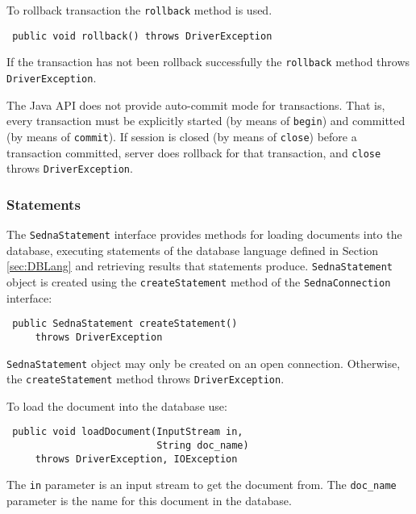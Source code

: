 \documentclass[a4paper,12pt]{article}
\begin{document}
To rollback transaction the \verb!rollback! method is used.

\begin{verbatim}
 public void rollback() throws DriverException
\end{verbatim}

If the transaction has not been rollback successfully the \verb!rollback! method
throws \verb!DriverException!.

The Java API does not provide auto-commit mode for transactions. That is, every
transaction must be explicitly started (by means of \verb!begin!) and committed
(by means of \verb!commit!). If session is closed (by means of \verb!close!)
before a transaction committed, server does rollback for that transaction, and
\verb!close! throws \verb!DriverException!.


\subsubsection{Statements}

The \verb!SednaStatement! interface provides methods for loading documents into
the database, executing statements of the database language defined in Section
\ref{sec:DBLang} and retrieving results that statements produce.
\verb!SednaStatement! object is created using the \verb!createStatement! method
of the \verb!SednaConnection! interface:

\begin{verbatim}
 public SednaStatement createStatement()
     throws DriverException
\end{verbatim}

\verb!SednaStatement! object may only be created on an open connection.
Otherwise, the \verb!createStatement! method throws \verb!DriverException!.

To load the document into the database use:

\begin{verbatim}
 public void loadDocument(InputStream in,
                          String doc_name)
     throws DriverException, IOException
\end{verbatim}

The \verb!in! parameter is an input stream to get the document from. The
\verb!doc_name! parameter is the name for this document in the database.
\end{document}
